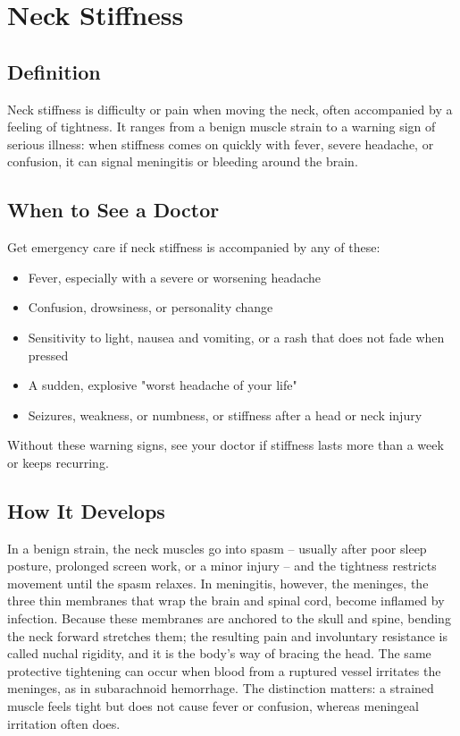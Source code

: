 \chapter{Neck Stiffness}

\section*{Definition}
Neck stiffness is difficulty or pain when moving the neck, often accompanied by a feeling of tightness. It ranges from a benign muscle strain to a warning sign of serious illness: when stiffness comes on quickly with fever, severe headache, or confusion, it can signal meningitis or bleeding around the brain.

\section*{When to See a Doctor}
Get emergency care if neck stiffness is accompanied by any of these:
\begin{itemize}
  \item Fever, especially with a severe or worsening headache
  \item Confusion, drowsiness, or personality change
  \item Sensitivity to light, nausea and vomiting, or a rash that does not fade when pressed
  \item A sudden, explosive "worst headache of your life"
  \item Seizures, weakness, or numbness, or stiffness after a head or neck injury
\end{itemize}
Without these warning signs, see your doctor if stiffness lasts more than a week or keeps recurring.

\section*{How It Develops}
In a benign strain, the neck muscles go into spasm -- usually after poor sleep posture, prolonged screen work, or a minor injury -- and the tightness restricts movement until the spasm relaxes. In meningitis, however, the meninges, the three thin membranes that wrap the brain and spinal cord, become inflamed by infection. Because these membranes are anchored to the skull and spine, bending the neck forward stretches them; the resulting pain and involuntary resistance is called nuchal rigidity, and it is the body's way of bracing the head. The same protective tightening can occur when blood from a ruptured vessel irritates the meninges, as in subarachnoid hemorrhage. The distinction matters: a strained muscle feels tight but does not cause fever or confusion, whereas meningeal irritation often does.

